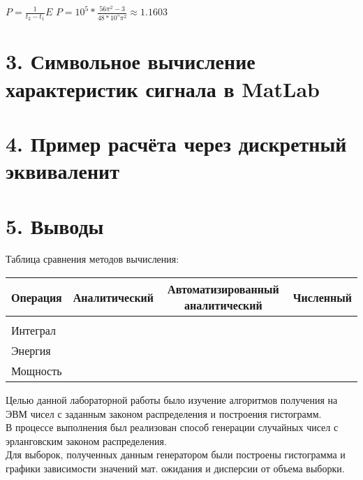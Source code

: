 \documentclass[12pt]{article}
\begin{document}
 $P = \frac{1}{t_2 - t_1}E$
 $P = 10^5 * \frac{56\pi^2 - 3}{48*10^5\pi^2} \approx 1.1603$
 
\newpage
 \section*{3. Символьное вычисление характеристик сигнала в MatLab}

 

\newpage
 \section*{4. Пример расчёта через дискретный эквиваленит}
 
\newpage
 \section*{5. Выводы}
 Таблица сравнения методов вычисления:
 \begin{center}
 	\begin{tabular}[c]{l|ccc}
 		Операция & Аналитический & Автоматизированный аналитический & Численный \\\hline
 		&&&\\
 		Интеграл & & & \\
 		Энергия & & & \\
 		Мощность & & & \\
 		
 	\end{tabular}
 \end{center}
 
 
Целью данной лабораторной работы было изучение алгоритмов получения на ЭВМ чисел с заданным законом распределения и построения гистограмм.\\

В процессе выполнения был реализован способ генерации случайных чисел с эрланговским законом распределения.\\

Для выборок, полученных данным генератором были построены гистограмма и графики зависимости значений мат. ожидания и дисперсии от объема выборки.
\end{document}
